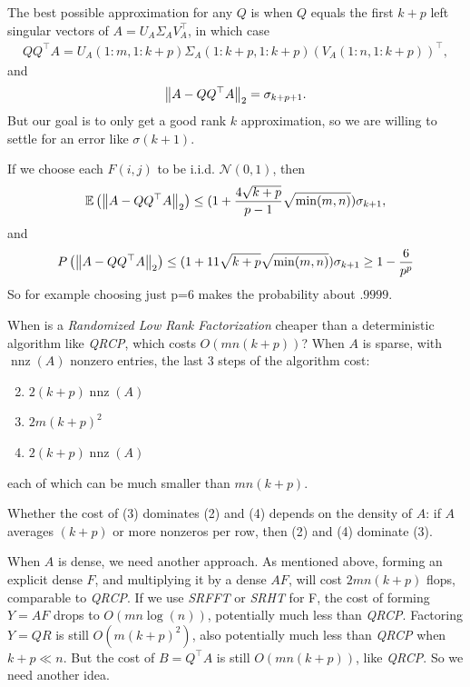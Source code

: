\documentclass[11pt]{article}
\numberwithin{equation}{section}
\begin{document}
The best possible approximation for any $Q$ is when $Q$ equals the first $k+p$ left
singular vectors of $A = U_A\Sigma_A V_A^\top$, in which case \begin{align*}
    QQ^\top A = U_A(1:m,1:k+p)\Sigma_A(1:k+p,1:k+p)(V_A(1:n,1:k+p))^\top,
\end{align*}
and \begin{align*}
    \left\| A-QQ^\top A \right\|_2 = \sigma_{k+p+1}.
\end{align*}
But our goal is to only get a good rank $k$ approximation, so we are willing to settle for an error like $\sigma(k+1)$.
\begin{theorem}
    If we choose each $F(i,j)$ to be i.i.d. $\mathcal{N}(0,1)$, then \begin{align*}
        \mathbb E\left( \left\| A-QQ^\top A \right\|_2 \right) \leq (1 + \frac{4 \sqrt{k+p}}{p-1} \sqrt{\min (m, n)} )\sigma_{k+1},
    \end{align*}
    and \begin{align*}
        P\left( \left\| A-QQ^\top A \right\|_2 \right) \leq (1 + 11\sqrt{k+p} \sqrt{\min (m, n)} )\sigma_{k+1} \geq 1 - \frac{6}{p^p}
    \end{align*}
    So for example choosing just p=6 makes the probability about $.9999$.
\end{theorem}

When is a \textit{Randomized Low Rank Factorization} cheaper than a deterministic algorithm like \textit{QRCP}, which costs $O(mn(k+p))$? When $A$ is sparse, 
with $\operatorname{nnz}(A)$ nonzero entries, the last 3 steps of the algorithm cost: \begin{enumerate}
    \setcounter{enumi}{1}
    \item $2(k+p)\operatorname{nnz}(A)$
    \item $2m(k+p)^2$
    \item $2(k+p)\operatorname{nnz}(A)$
\end{enumerate}
each of which can be much smaller than $mn(k+p)$.

Whether the cost of (3) dominates (2) and (4) depends on the density of $A$: if $A$ averages $(k+p)$ or more nonzeros per row, then (2) and (4) dominate (3).

When $A$ is dense, we need another approach. As mentioned above, forming an explicit dense $F$, and multiplying it by a dense $AF$, will cost $2mn(k+p)$ flops, 
comparable to \textit{QRCP}. If we use \textit{SRFFT} or \textit{SRHT} for F, the cost of forming $Y=AF$ drops to $O(mn\log(n))$, 
potentially much less than \textit{QRCP}. Factoring $Y=QR$ is still $O(m(k+p)^2)$, also potentially much less than \textit{QRCP} when $k+p \ll n$. 
But the cost of $B = Q^\top A$ is still $O(mn(k+p))$, like \textit{QRCP}. So we need another idea.
\end{document}
